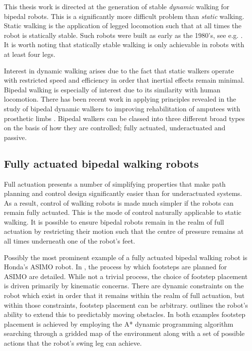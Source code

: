 This thesis work is directed at the generation of stable \textit{dynamic} walking for bipedal robots. This is a significantly more difficult problem than \textit{static} walking. Static walking is the application of legged locomotion such that at all times the robot is statically stable. Such robots were built as early as the 1980's, see e.g. \cite{russell1983odex, waldron1986adaptive}. It is worth noting that statically stable walking is only achievable in robots with at least four legs.

Interest in dynamic walking arises due to the fact that static walkers operate with restricted speed and efficiency in order that inertial effects remain minimal. Bipedal walking is especially of interest due to its similarity with human locomotion. There has been recent work in applying principles revealed in the study of bipedal dynamic walkers to improving rehabilitation of amputees with prosthetic limbs \cite{martinpredicting}. Bipedal walkers can be classed into three different broad types on the basis of how they are controlled; fully actuated, underactuated and passive.

\subsection{Fully actuated bipedal walking robots}
Full actuation presents a number of simplifying properties that make path planning and control design significantly easier than for underactuated systems. As a result, control of walking robots is made much simpler if the robots can remain fully actuated. This is the mode of control naturally applicable to static walking. It is possible to ensure bipedal robots remain in the realm of full actuation by restricting their motion such that the centre of pressure remains at all times underneath one of the robot's feet.

Possibly the most prominent example of a fully actuated bipedal walking robot is Honda's ASIMO robot. In \cite{chestnutt2005footstep}, the process by which footsteps are planned for ASIMO are detailed. While not a trivial process, the choice of footstep placement is driven primarily by kinematic concerns. There are dynamic constraints on the robot which exist in order that it remains within the realm of full actuation, but within those constraints, footstep placement can be arbitrary. \cite{chestnutt2007locomotion} outlines the robot's ability to extend this to predictably moving obstacles. In both examples footstep placement is achieved by employing the A* dynamic programming algorithm searching through a gridded map of the environment along with a set of possible actions that the robot's swing leg can achieve.

